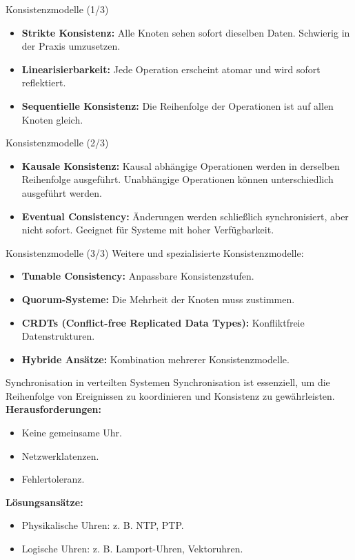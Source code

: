 \documentclass{beamer}
\begin{document}
\begin{frame}{Konsistenzmodelle (1/3)}
    \begin{itemize}
        \item \textbf{Strikte Konsistenz:} Alle Knoten sehen sofort dieselben Daten. Schwierig in der Praxis umzusetzen.
        \item \textbf{Linearisierbarkeit:} Jede Operation erscheint atomar und wird sofort reflektiert.
        \item \textbf{Sequentielle Konsistenz:} Die Reihenfolge der Operationen ist auf allen Knoten gleich.
    \end{itemize}
\end{frame}

\begin{frame}{Konsistenzmodelle (2/3)}
    \begin{itemize}
        \item \textbf{Kausale Konsistenz:} Kausal abhängige Operationen werden in derselben Reihenfolge ausgeführt. Unabhängige Operationen können unterschiedlich ausgeführt werden.
        \item \textbf{Eventual Consistency:} Änderungen werden schließlich synchronisiert, aber nicht sofort. Geeignet für Systeme mit hoher Verfügbarkeit.
    \end{itemize}
\end{frame}

\begin{frame}{Konsistenzmodelle (3/3)}
    Weitere und spezialisierte Konsistenzmodelle:
    \begin{itemize}
        \item \textbf{Tunable Consistency:} Anpassbare Konsistenzstufen.
        \item \textbf{Quorum-Systeme:} Die Mehrheit der Knoten muss zustimmen.
        \item \textbf{CRDTs (Conflict-free Replicated Data Types):} Konfliktfreie Datenstrukturen.
        \item \textbf{Hybride Ansätze:} Kombination mehrerer Konsistenzmodelle.
    \end{itemize}
\end{frame}

\begin{frame}{Synchronisation in verteilten Systemen}
    Synchronisation ist essenziell, um die Reihenfolge von Ereignissen zu koordinieren und Konsistenz zu gewährleisten. \newline
    \textbf{Herausforderungen:}
    \begin{itemize}
        \item Keine gemeinsame Uhr.
        \item Netzwerklatenzen.
        \item Fehlertoleranz.
    \end{itemize}
    \textbf{Lösungsansätze:}
    \begin{itemize}
        \item Physikalische Uhren: z. B. NTP, PTP.
        \item Logische Uhren: z. B. Lamport-Uhren, Vektoruhren.
    \end{itemize}
\end{frame}
\end{document}
